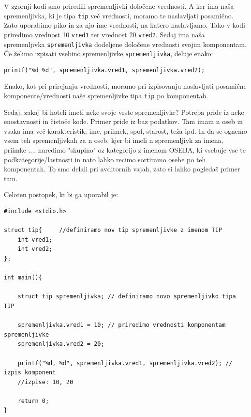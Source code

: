 \documentclass[a4paper, 12pt]{article}
\begin{document}
V zgornji kodi smo priredili spremenljivki določene vrednosti. A ker ima naša spremenljivka, ki je tipa \lstinline|tip| več vrednosti, moramo te naslavljati posamično. Zato uporabimo piko in za njo ime vrednosti, na katero naslavljamo. Tako v kodi priredimo vrednost 10 \lstinline|vred1| ter vrednost 20 \lstinline|vred2|. Sedaj ima naša spremenljivka \lstinline|spremenljivka| dodeljene določene vrednosti svojim komponentam. Če želimo izpisati vsebino spremenljivke \lstinline|spremenljivka|, deluje enako:

\begin{lstlisting}
printf("%d %d", spremenljivka.vred1, spremenljivka.vred2);
\end{lstlisting}

Enako, kot pri prirejanju vrednosti, moramo pri izpisovanju naslavljati posamične komponente/vrednosti naše spremenljivke tipa \lstinline|tip| po komponentah.\

Sedaj, zakaj bi hoteli imeti neke svoje vrste spremenljivke? Potreba pride iz neke enostavnosti in čistoče kode. Primer pride iz baz podatkov. Tam imam n oseb in vsaka ima več karakteristik; ime, priimek, spol, starost, teža ipd. In da se ognemo vsem teh spremenljivkah za n oseb, kjer bi imeli n spremenljivk za imena, priimke ..., naredimo "skupino" oz kategorijo z imenom OSEBA, ki vsebuje vse te podkategorije/lastnosti in nato lahko recimo sortiramo osebe po teh komponentah. To smo delali pri avditornih vajah, zato si lahko pogledaš primer tam.\

Celoten postopek, ki bi ga uporabil je:

\begin{lstlisting}
#include <stdio.h>

struct tip{ 	//definiramo nov tip spremenljivke z imenom TIP 
	int vred1;
	int vred2;
};

int main(){
	
	struct tip spremenljivka; // definiramo novo spremenljivko tipa TIP
	
	spremenljivka.vred1 = 10; // priredimo vrednosti komponentam spremenljivke
	spremenljivka.vred2 = 20;
	
	printf("%d, %d", spremenljivka.vred1, spremenljivka.vred2); // izpis komponent
	//izpise: 10, 20

	return 0;
}
\end{lstlisting}
\end{document}
